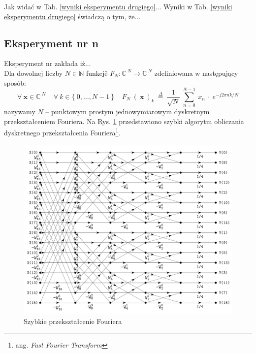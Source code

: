 \documentclass[12pt]{article}
\begin{document}
\noindent Jak widać w Tab. \ref{wyniki eksperymentu drugiego}...\newline
Wyniki w Tab. \ref{wyniki eksperymentu drugiego} świadczą o tym, że...


\subsection{Eksperyment nr n}
Eksperyment nr zakłada iż...\\
Dla dowolnej liczby $N \in \mathbb{N}$ funkcjê 
$F_{N}:\mathbb{C}^{\:N}\!\rightarrow\mathbb{C}^{\:N}$
zdefiniowana w następujący sposób:
\vspace{-0.4cm}
\begin{equation}
 \forall\:\mathbf{x} \in \mathbb{C}^{\:N}\:\:\:\:\:
 \forall\:k \in \{\:0,\dots,N - 1\:\!\}\:\:\:\:\:
 F_{N}\:\!(\:\mathbf{x}\:)_{k}\:\stackrel{\Delta}{=}\:
 \frac{1}{\sqrt{N}}\:
 \sum_{n = 0}^{N - 1}\:x_{n}\:\cdot\:
 e^{-j 2 \pi n k / N}
 \label{równanie dyskretnej transformaty Fouriera}
\end{equation}
nazywamy $N$ -- punktowym prostym jednowymiarowym dyskretnym przekształceniem Fouriera.
Na Rys. \ref{FFT} przedstawiono szybki algorytm obliczania dyskretnego 
przekształcenia Fouriera\footnote{ang. \textit{Fast Fourier Transform}}.
\begin{figure}[h!]
 \centering
 \includegraphics[width=0.8\linewidth]{transformata.pdf}
 \vspace{-0.1cm}
 \caption{Szybkie przekształcenie Fouriera}
 \label{FFT}
\end{figure}
\end{document}
